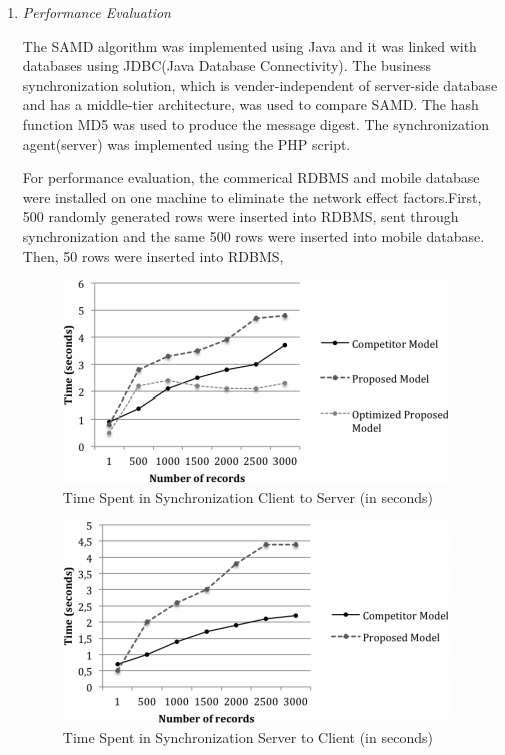 \documentclass[conference]{IEEEtran}
\begin{document}
\begin{enumerate}[label=(\Alph*)]
\setlength\itemsep{1em}

\item  \textit{Performance Evaluation}

The SAMD algorithm was implemented using Java and it was linked with databases using JDBC(Java Database Connectivity). The business synchronization solution, which is vender-independent of server-side database and has a middle-tier architecture, was used to compare SAMD. The hash function MD5 was used to produce the message digest. The synchronization agent(server) was implemented using the PHP script.

For performance evaluation, the commerical RDBMS and mobile database were installed on one machine to eliminate the network effect factors.First, 500 randomly generated rows were inserted into RDBMS, sent through synchronization and the same 500 rows were inserted into mobile database. Then, 50 rows were inserted into RDBMS, 

\begin{figure}[h]
	\centering
	\includegraphics[width=1.1\linewidth]{newgraph.png} 
	\caption{Time Spent in Synchronization Client to Server (in seconds)}
	\label{graphs1}
\end{figure}

\begin{figure}[h]
	\centering
	\includegraphics[width=1.1\linewidth]{graph.png} 
	\caption{Time Spent in Synchronization Server to Client (in seconds) }
	\label{graphss1}
\end{figure}


\end{enumerate}
\end{document}
